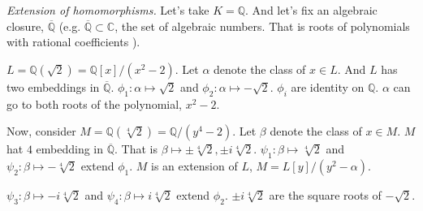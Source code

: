 \begin{example} \textit{Extension of homomorphisms.} Let's take $K = \mathbb{Q}$. And let's fix an algebraic closure, $\overbar{\mathbb{Q}}$ (e.g. $\overbar{\mathbb{Q}}\subset\mathbb{C}$, the set of algebraic numbers. That is roots of polynomials with rational coefficients ). 

$L=\mathbb{Q}(\sqrt{2})=\mathbb{Q}[x]/(x^2-2)$. Let $\alpha$ denote the class of $x\in L$. And $L$ has two embeddings in $\overbar{\mathbb{Q}}$. $\phi_1:\alpha\mapsto\sqrt{2}$ and $\phi_2:\alpha\mapsto-\sqrt{2}$. $\phi_i$ are identity on $\mathbb{Q}$. $\alpha$ can go to both roots of the polynomial, $x^2 - 2$.

Now, consider $M=\mathbb{Q}(\sqrt[4]{2})=\mathbb{Q}/(y^4 - 2)$. Let $\beta$ denote the class of $x\in M$. $M$ hat $4$ embedding in $\overbar{\mathbb{Q}}$. That is $\beta\mapsto \pm \sqrt[4]{2}, \pm i\sqrt[4]{2}$. $\psi_1:\beta\mapsto\sqrt[4]{2}$ and $\psi_2:\beta\mapsto-\sqrt[4]{2}$ extend $\phi_1$. $M$ is an extension of $L$, $M=L[y]/(y^2-\alpha)$.

$\psi_3:\beta\mapsto-i\sqrt[4]{2}$ and $\psi_4:\beta\mapsto i\sqrt[4]{2}$ extend $\phi_2$. 
$\pm i\sqrt[4]{2}$ are the square roots of $ -\sqrt{2}$.
\end{example}
